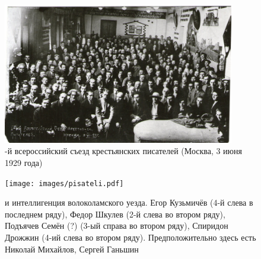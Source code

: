 \begin{figure}
  \centering
  \includegraphics[width=0.9\textwidth]{images/syezd.pdf}
  \caption*{\small{}-й всероссийский съезд крестьянских писателей (Москва, 3 июня 1929 года)}
\end{figure}

\begin{figure}
  \centering
  \texttt{[image: images/pisateli.pdf]}
  \caption*{ и интеллигенция волоколамского уезда. Егор Кузьмичёв (4-й слева в последнем ряду), Федор Шкулев (2-й слева во втором ряду), Подъячев Семён (?) (3-ый справа во втором ряду), Спиридон Дрожжин (4-ий слева во втором ряду). Предположительно здесь есть Николай Михайлов, Сергей Ганьшин}
\end{figure}

